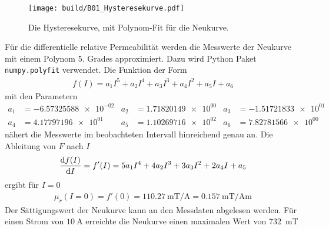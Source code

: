 \begin{figure}[H] %
    \texttt{[image: build/B01\_Hysteresekurve.pdf]}
    \caption{Die Hysteresekurve, mit Polynom-Fit für die Neukurve.}
    \label{fig:Hysteresekurve_werte}
\end{figure}

Für die differentielle relative Permeabilität werden die Messwerte der Neukurve mit einem Polynom 5. Grades approximiert.
Dazu wird Python Paket \texttt{numpy.polyfit} \cite[][]{numpy} verwendet. 
Die Funktion der Form
\begin{align}
    f(I) = a_1 I^5 + a_2 I^4 + a_3 I^3 + a_4 I^2 + a_5 I + a_6 
\end{align}
mit den Parametern
\begin{align*}
    a_1 &=  \num{-6.57325588e-02} &
    a_2 &=  \num{1.71820149e+00} &
    a_3 &=  \num{-1.51721833e+01} \\
    a_4 &=  \num{4.17797196e+01} &
    a_5 &=  \num{1.10269716e+02} &
    a_6 &=  \num{7.82781566e+00} &
\end{align*}
nähert die Messwerte im beobachteten Intervall hinreichend genau an.
Die Ableitung von $F$ nach $I$ 
\begin{align*}
   \frac{\mathop{}\!\mathrm{d} f(I)}{\mathop{}\!\mathrm{d} I} = f'(I) = 5a_1 I^4 + 4a_2 I^3 + 3a_3 I^2 + 2a_4 I + a_5   
\end{align*}
ergibt für $I=0$
\begin{align}
    \mu_{r}(I=0) = f'(0) = \qty{110.27}{\milli\tesla\per\ampere} = \qty{0.157}{\milli\tesla\per\ampere\meter} 
\end{align}
Der Sättigungswert der Neukurve kann an den Messdaten abgelesen werden. 
Für einen Strom von $\qty[]{10}{\ampere}$ erreichte die Neukurve einen maximalen Wert von \qty{732}{\milli\tesla}
